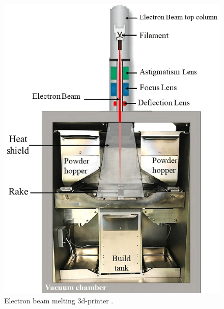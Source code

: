 \begin{figure}
    \centering
    \includegraphics[scale=0.3]{Images/A-schematic-of-electron-beam-melting-EBM.png}
    \caption[EBM 3d-printer.]{Electron beam melting 3d-printer \cite{azam_-depth_2018}.}
    \label{fig:ebm_printer}
\end{figure}
